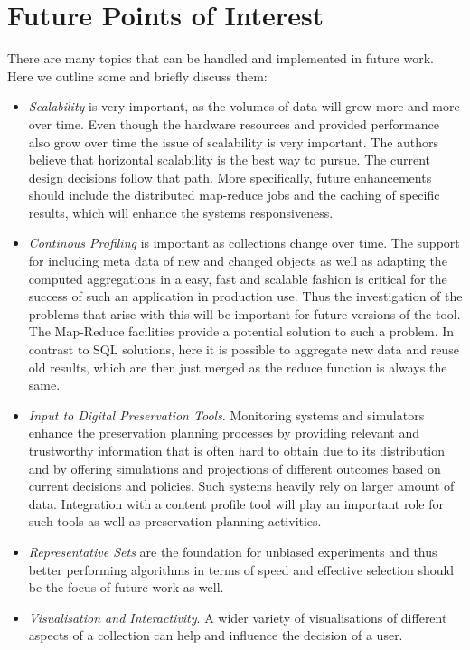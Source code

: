\section{Future Points of Interest}
There are many topics that can be handled and implemented in future work. Here we outline some and briefly discuss them:
\begin {itemize}
\item \textit{Scalability} is very important, as the volumes of data will grow more and more over time. Even though the hardware resources and provided performance also grow over time the issue of scalability is very important. The authors believe that horizontal scalability is the best way to pursue. The current design decisions follow that path. More specifically, future enhancements should include the distributed map-reduce jobs and the caching of specific results, which will enhance the systems responsiveness.

\item \textit{Continous Profiling} is important as collections change over time. The support for including meta data of new and changed objects as well as adapting the computed aggregations in a easy, fast and scalable fashion is critical for the success of such an application in production use. Thus the investigation of the problems that arise with this will be important for future versions of the tool. The Map-Reduce facilities provide a potential solution to such a problem. In contrast to SQL solutions, here it is possible to aggregate new data and reuse old results, which are then just merged as the reduce function is always the same.

\item \textit{Input to Digital Preservation Tools}. Monitoring systems and simulators enhance the preservation planning processes by providing relevant and trustworthy information that is often hard to obtain due to its distribution and by offering simulations and projections of different outcomes based on current decisions and policies. Such systems heavily rely on larger amount of data. Integration with a content profile tool will play an important role for such tools as well as preservation planning activities.

\item \textit{Representative Sets} are the foundation for unbiased experiments and thus better performing algorithms in terms of speed and effective selection should be the focus of future work as well. 

\item \textit{Visualisation and Interactivity}. A wider variety of visualisations of different aspects of a collection can help and influence the decision of a user.
\end{itemize}

